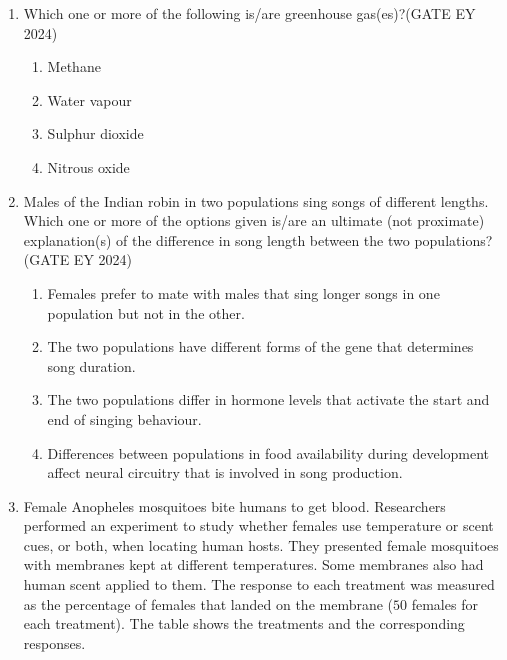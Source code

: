 \begin{enumerate}
    \begin{multicols}{2}
    \begin{enumerate}
        \item Competitive exclusion
        \item Character displacement
        \item Convergent evolution
        \item Allopatric speciation
    \end{enumerate}
    \end{multicols}
\item Which one or more of the following is/are greenhouse gas(es)?\hfill{(GATE EY 2024)}
    \begin{multicols}{2}
    \begin{enumerate}
        \item Methane
        \item Water vapour
        \item Sulphur dioxide
        \item Nitrous oxide
    \end{enumerate}
    \end{multicols}
\item Males of the Indian robin in two populations sing songs of different lengths. Which one or more of the options given is/are an ultimate (not proximate) explanation(s) of the difference in song length between the two populations?\hfill{(GATE EY 2024)}
    \begin{enumerate}
        \item Females prefer to mate with males that sing longer songs in one population but not in the other.
        \item The two populations have different forms of the gene that determines song duration.
        \item The two populations differ in hormone levels that activate the start and end of singing behaviour.
        \item Differences between populations in food availability during development affect neural circuitry that is involved in song production.
    \end{enumerate}
\item Female Anopheles mosquitoes bite humans to get blood. Researchers performed an experiment to study whether females use temperature or scent cues, or both, when locating human hosts. They presented female mosquitoes with membranes kept at different temperatures. Some membranes also had human scent applied to them. The response to each treatment was measured as the percentage of females that landed on the membrane ($50$ females for each treatment). The table shows the treatments and the corresponding responses.\\

\end{enumerate}
